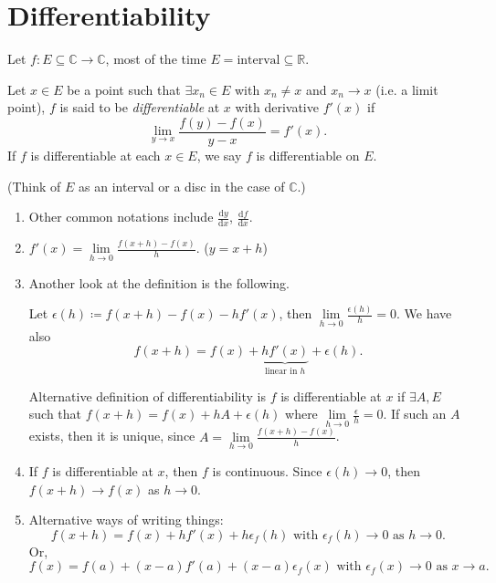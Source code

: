 \section{Differentiability}
Let \(f: E \subseteq \mathbb{C} \to \mathbb{C}\), most of the time \(E = \text{interval} \subseteq \mathbb{R}\).
\begin{definition}
    Let \(x \in E\) be a point such that \(\exists x_n \in E\) with \(x_n \neq x\) and \(x_n \to x\) (i.e. a limit point), \(f\) is said to be \textit{differentiable}  at \(x\) with derivative \(f'(x)\) if
    \[
        \lim\limits_{y \to x} \frac{f(y) - f(x)}{y - x} = f'(x).
    \]
    If \(f\) is differentiable at each \(x \in E\), we say \(f\) is differentiable on \(E\).

    (Think of \(E\) as an interval or a disc in the case of \(\mathbb{C}\).)
\end{definition}
\begin{remark}
    \leavevmode
    \begin{enumerate}
        \item Other common notations include \(\frac{\mathrm{d}y}{\mathrm{d}x}\), \(\frac{\mathrm{d}f}{\mathrm{d}x} \).
        \item \(f'(x) = \lim\limits_{h \to 0} \frac{f(x+h)-f(x)}{h}\). (\(y=x+h\))
        \item Another look at the definition is the following.
        
        Let \(\epsilon(h) \coloneqq f(x + h) - f(x) - hf'(x)\), then \(\lim\limits_{h \to 0} \frac{\epsilon(h)}{h}=0\). We have also
        \[
            f(x+h) = f(x) + \underbrace{hf'(x)}_{\text{linear in }h} + \epsilon(h).
        \]

        Alternative definition of differentiability is \(f\) is differentiable at \(x\) if \(\exists A, E\) such that \(f(x + h) = f(x) + hA + \epsilon(h)\) where \(\lim\limits_{h \to 0} \frac{\epsilon}{h}=0\). If such an \(A\) exists, then it is unique, since \(A = \lim\limits_{h \to 0} \frac{f(x+h) - f(x)}{h}\).
        \item If \(f\) is differentiable at \(x\), then \(f\) is continuous. Since \(\epsilon(h) \to 0\), then \(f(x + h) \to f(x)\) as \(h \to 0\).
        \item Alternative ways of writing things:
        \[
            f(x + h) = f(x) + hf'(x) + h\epsilon_f(h) \text{ with } \epsilon_f(h) \to 0 \text{ as } h\to 0.
        \]
        Or,
        \[
            f(x) = f(a) + (x-a)f'(a) + (x-a)\epsilon_f(x) \text{ with } \epsilon_f(x) \to 0 \text{ as } x\to a.
        \]
    \end{enumerate}
\end{remark}
